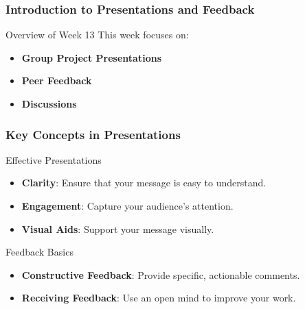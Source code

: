 \documentclass[aspectratio=169]{beamer}
\begin{document}
\frame{\titlepage}

\begin{frame}[fragile]
    \frametitle{Introduction to Presentations and Feedback}
    
    \begin{block}{Overview of Week 13}
        This week focuses on:
        \begin{itemize}
            \item \textbf{Group Project Presentations}
            \item \textbf{Peer Feedback}
            \item \textbf{Discussions}
        \end{itemize}
    \end{block}
\end{frame}

\begin{frame}[fragile]
    \frametitle{Key Concepts in Presentations}

    \begin{block}{Effective Presentations}
        \begin{itemize}
            \item \textbf{Clarity}: Ensure that your message is easy to understand.
            \item \textbf{Engagement}: Capture your audience’s attention.
            \item \textbf{Visual Aids}: Support your message visually.
        \end{itemize}
    \end{block}

    \begin{block}{Feedback Basics}
        \begin{itemize}
            \item \textbf{Constructive Feedback}: Provide specific, actionable comments.
            \item \textbf{Receiving Feedback}: Use an open mind to improve your work.
        \end{itemize}
    \end{block}
\end{frame}
\end{document}
